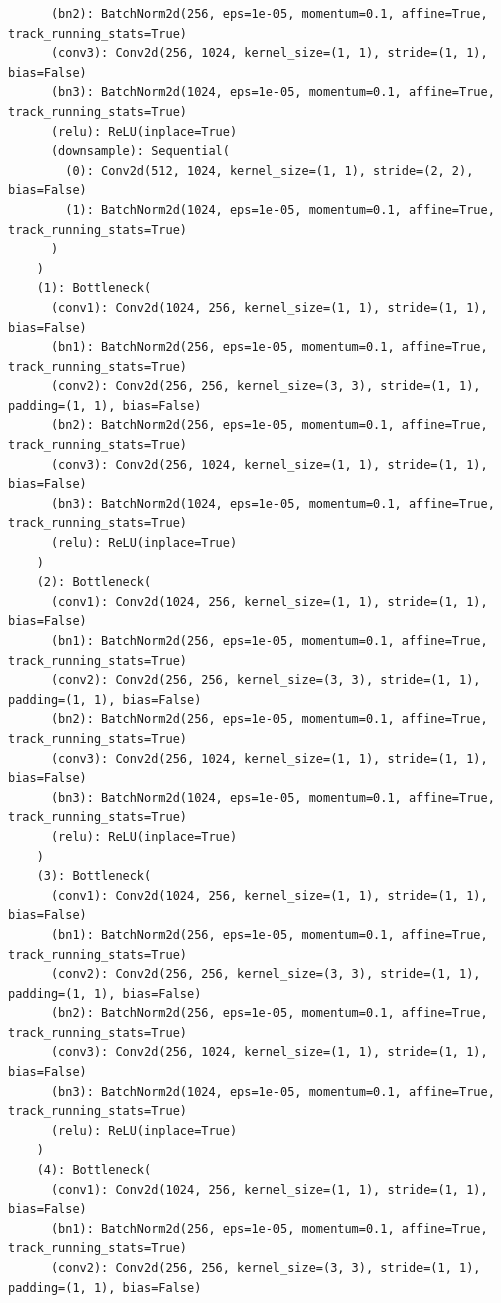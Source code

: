 \documentclass{article}
\begin{document}
\begin{verbatim}
      (bn2): BatchNorm2d(256, eps=1e-05, momentum=0.1, affine=True, track_running_stats=True)
      (conv3): Conv2d(256, 1024, kernel_size=(1, 1), stride=(1, 1), bias=False)
      (bn3): BatchNorm2d(1024, eps=1e-05, momentum=0.1, affine=True, track_running_stats=True)
      (relu): ReLU(inplace=True)
      (downsample): Sequential(
        (0): Conv2d(512, 1024, kernel_size=(1, 1), stride=(2, 2), bias=False)
        (1): BatchNorm2d(1024, eps=1e-05, momentum=0.1, affine=True, track_running_stats=True)
      )
    )
    (1): Bottleneck(
      (conv1): Conv2d(1024, 256, kernel_size=(1, 1), stride=(1, 1), bias=False)
      (bn1): BatchNorm2d(256, eps=1e-05, momentum=0.1, affine=True, track_running_stats=True)
      (conv2): Conv2d(256, 256, kernel_size=(3, 3), stride=(1, 1), padding=(1, 1), bias=False)
      (bn2): BatchNorm2d(256, eps=1e-05, momentum=0.1, affine=True, track_running_stats=True)
      (conv3): Conv2d(256, 1024, kernel_size=(1, 1), stride=(1, 1), bias=False)
      (bn3): BatchNorm2d(1024, eps=1e-05, momentum=0.1, affine=True, track_running_stats=True)
      (relu): ReLU(inplace=True)
    )
    (2): Bottleneck(
      (conv1): Conv2d(1024, 256, kernel_size=(1, 1), stride=(1, 1), bias=False)
      (bn1): BatchNorm2d(256, eps=1e-05, momentum=0.1, affine=True, track_running_stats=True)
      (conv2): Conv2d(256, 256, kernel_size=(3, 3), stride=(1, 1), padding=(1, 1), bias=False)
      (bn2): BatchNorm2d(256, eps=1e-05, momentum=0.1, affine=True, track_running_stats=True)
      (conv3): Conv2d(256, 1024, kernel_size=(1, 1), stride=(1, 1), bias=False)
      (bn3): BatchNorm2d(1024, eps=1e-05, momentum=0.1, affine=True, track_running_stats=True)
      (relu): ReLU(inplace=True)
    )
    (3): Bottleneck(
      (conv1): Conv2d(1024, 256, kernel_size=(1, 1), stride=(1, 1), bias=False)
      (bn1): BatchNorm2d(256, eps=1e-05, momentum=0.1, affine=True, track_running_stats=True)
      (conv2): Conv2d(256, 256, kernel_size=(3, 3), stride=(1, 1), padding=(1, 1), bias=False)
      (bn2): BatchNorm2d(256, eps=1e-05, momentum=0.1, affine=True, track_running_stats=True)
      (conv3): Conv2d(256, 1024, kernel_size=(1, 1), stride=(1, 1), bias=False)
      (bn3): BatchNorm2d(1024, eps=1e-05, momentum=0.1, affine=True, track_running_stats=True)
      (relu): ReLU(inplace=True)
    )
    (4): Bottleneck(
      (conv1): Conv2d(1024, 256, kernel_size=(1, 1), stride=(1, 1), bias=False)
      (bn1): BatchNorm2d(256, eps=1e-05, momentum=0.1, affine=True, track_running_stats=True)
      (conv2): Conv2d(256, 256, kernel_size=(3, 3), stride=(1, 1), padding=(1, 1), bias=False)

\end{verbatim}
\end{document}
